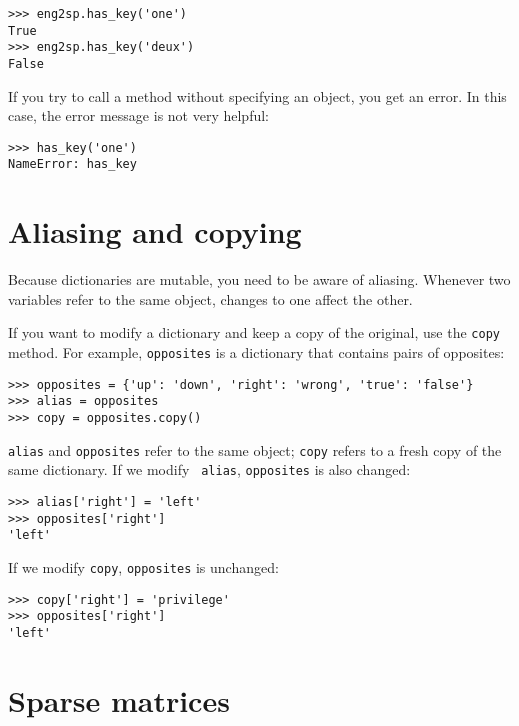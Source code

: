 \beforeverb
\begin{verbatim}
>>> eng2sp.has_key('one')
True
>>> eng2sp.has_key('deux')
False
\end{verbatim}
\afterverb
%
If you try to call a method without specifying an object, you get an
error.  In this case, the error message is not very helpful:

\beforeverb
\begin{verbatim}
>>> has_key('one')
NameError: has_key
\end{verbatim}
\afterverb
%



\section{Aliasing and copying}

Because dictionaries are mutable, you need to be aware of aliasing.
Whenever two variables refer to the same object, changes to one affect
the other.

If you want to modify a dictionary and keep a copy of the original,
use the {\tt copy} method.  For example, {\tt opposites} is a
dictionary that contains pairs of opposites:

\beforeverb
\begin{verbatim}
>>> opposites = {'up': 'down', 'right': 'wrong', 'true': 'false'}
>>> alias = opposites
>>> copy = opposites.copy()
\end{verbatim}
\afterverb
%
{\tt alias} and {\tt opposites} refer to the same object; {\tt copy}
refers to a fresh copy of the same dictionary.  If we modify {\tt
alias}, {\tt opposites} is also changed:

\beforeverb
\begin{verbatim}
>>> alias['right'] = 'left'
>>> opposites['right']
'left'
\end{verbatim}
\afterverb
%
If we modify {\tt copy}, {\tt opposites} is unchanged:

\beforeverb
\begin{verbatim}
>>> copy['right'] = 'privilege'
>>> opposites['right']
'left'
\end{verbatim}
\afterverb
%


\section{Sparse matrices }

